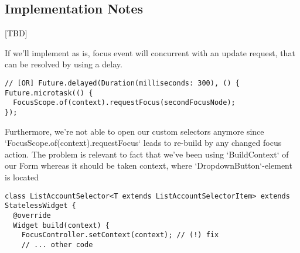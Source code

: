 \subsection{Implementation Notes}

[TBD]

If we'll implement as is, focus event will concurrent with an update request, that can be resolved by using a delay.

\begin{lstlisting}
// [OR] Future.delayed(Duration(milliseconds: 300), () {
Future.microtask(() {
  FocusScope.of(context).requestFocus(secondFocusNode);
});
\end{lstlisting}

Furthermore, we're not able to open our custom selectors anymore since `FocusScope.of(context).requestFocus` leads to 
re-build by any changed focus action. The problem is relevant to fact that we've been using `BuildContext` of our Form
whereas it should be taken context, where `DropdownButton`-element is located 

\begin{lstlisting}
class ListAccountSelector<T extends ListAccountSelectorItem> extends StatelessWidget {
  @override
  Widget build(context) {
    FocusController.setContext(context); // (!) fix
    // ... other code
\end{lstlisting}